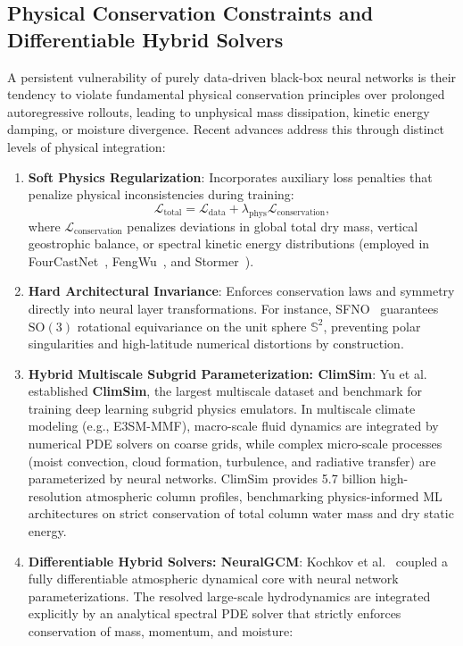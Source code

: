 \subsection{Physical Conservation Constraints and Differentiable Hybrid Solvers}
\label{sec:physics_conservation}
A persistent vulnerability of purely data-driven black-box neural networks is their tendency to violate fundamental physical conservation principles over prolonged autoregressive rollouts, leading to unphysical mass dissipation, kinetic energy damping, or moisture divergence. Recent advances address this through distinct levels of physical integration:
\begin{enumerate}
    \item \textbf{Soft Physics Regularization}: Incorporates auxiliary loss penalties that penalize physical inconsistencies during training:
    \begin{equation}
        \mathcal{L}_{\text{total}} = \mathcal{L}_{\text{data}} + \lambda_{\text{phys}} \mathcal{L}_{\text{conservation}},
    \end{equation}
    where $\mathcal{L}_{\text{conservation}}$ penalizes deviations in global total dry mass, vertical geostrophic balance, or spectral kinetic energy distributions (employed in FourCastNet~\cite{pathak2022fourcastnet}, FengWu~\cite{chen2023fengwu}, and Stormer~\cite{nguyen2023stormer}).
    \item \textbf{Hard Architectural Invariance}: Enforces conservation laws and symmetry directly into neural layer transformations. For instance, SFNO~\cite{bonev2023sfno} guarantees $\mathrm{SO}(3)$ rotational equivariance on the unit sphere $\mathbb{S}^2$, preventing polar singularities and high-latitude numerical distortions by construction.
    \item \textbf{Hybrid Multiscale Subgrid Parameterization: ClimSim}: Yu et al.~\cite{yu2023climsim} established \textbf{ClimSim}, the largest multiscale dataset and benchmark for training deep learning subgrid physics emulators. In multiscale climate modeling (e.g., E3SM-MMF), macro-scale fluid dynamics are integrated by numerical PDE solvers on coarse grids, while complex micro-scale processes (moist convection, cloud formation, turbulence, and radiative transfer) are parameterized by neural networks. ClimSim provides 5.7 billion high-resolution atmospheric column profiles, benchmarking physics-informed ML architectures on strict conservation of total column water mass and dry static energy.
    \item \textbf{Differentiable Hybrid Solvers: NeuralGCM}: Kochkov et al.~\cite{kochkov2024neuralgcm} coupled a fully differentiable atmospheric dynamical core with neural network parameterizations. The resolved large-scale hydrodynamics are integrated explicitly by an analytical spectral PDE solver that strictly enforces conservation of mass, momentum, and moisture:

\end{enumerate}
